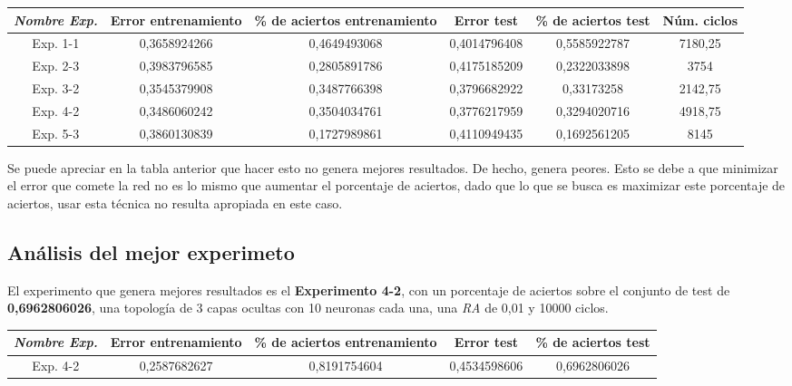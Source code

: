 \documentclass{uc3mpracticas}
\begin{document}
\begin{center}
  \begin{adjustwidth}{-1.4cm}{}
    \begin{tabular}{|c|c|c|c|c|c|}
      \hline
          \textit{\textbf{Nombre Exp.}}     & \textbf{Error entrenamiento} & \textbf{\% de aciertos entrenamiento} & \textbf{Error test} & \textbf{\% de aciertos test} & \textbf{Núm. ciclos} \\ \hline
          Exp. 1-1         &  0,3658924266       &  0,4649493068                &  0,4014796408   &  0,5585922787   &  7180,25  \\ \hline
          Exp. 2-3         &  0,3983796585       &  0,2805891786                &  0,4175185209   &  0,2322033898   &  3754     \\ \hline
          Exp. 3-2         &  0,3545379908       &  0,3487766398                &  0,3796682922   &  0,33173258     &  2142,75  \\ \hline
          Exp. 4-2         &  0,3486060242       &  0,3504034761                &  0,3776217959   &  0,3294020716   &  4918,75  \\ \hline
          Exp. 5-3         &  0,3860130839       &  0,1727989861                &  0,4110949435   &  0,1692561205   &  8145     \\ \hline
    \end{tabular}
  \end{adjustwidth}
\end{center}

Se puede apreciar en la tabla anterior que hacer esto no genera mejores resultados. De hecho, genera peores. Esto se debe a que minimizar el error que comete la red no es lo mismo que aumentar el porcentaje de aciertos, dado que lo que se busca es maximizar este porcentaje de aciertos, usar esta técnica no resulta apropiada en este caso.



\subsection{Análisis del mejor experimeto}

El experimento que genera mejores resultados es el \textbf{Experimento 4-2}, con un porcentaje de aciertos sobre el conjunto de test de \textbf{0,6962806026}, una topología de 3 capas ocultas con 10 neuronas cada una, una \textit{RA} de 0,01 y 10000 ciclos.

\begin{center}
  \begin{tabular}{|c|c|c|c|c|}
    \hline
        \textit{\textbf{Nombre Exp.}}     & \textbf{Error entrenamiento} & \textbf{\% de aciertos entrenamiento} & \textbf{Error test} & \textbf{\% de aciertos test}\\ \hline
        Exp. 4-2         &  0,2587682627       &  0,8191754604                &  0,4534598606   &  0,6962806026     \\ \hline
  \end{tabular}
\end{center}
\end{document}
